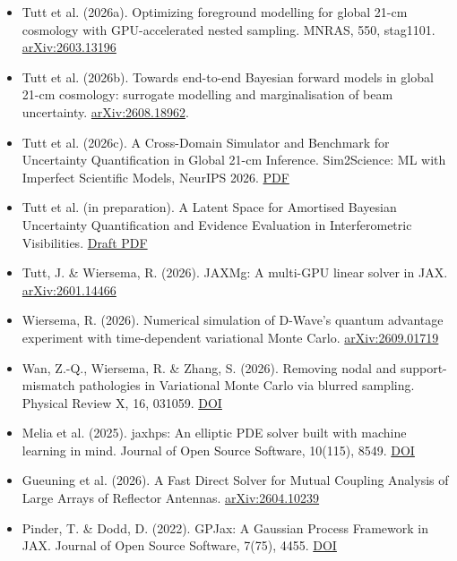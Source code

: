 \documentclass[12pt,a4paper]{awesome-cv}
\begin{document}
\begin{cvletter}
\begin{samepage}
\color{black}
\begingroup
\fontsize{9pt}{11pt}\selectfont
\begin{itemize}[topsep=0pt,itemsep=2pt,parsep=0pt]
\item Tutt et al. (2026a). Optimizing foreground modelling for global 21-cm cosmology with GPU-accelerated nested sampling. MNRAS, 550, stag1101. \enskip\textbullet\enskip \href{https://arxiv.org/abs/2603.13196}{\color{awesome}arXiv:2603.13196}
\item Tutt et al. (2026b). Towards end-to-end Bayesian forward models in global 21-cm cosmology: surrogate modelling and marginalisation of beam uncertainty. \href{https://arxiv.org/abs/2608.18962}{\color{awesome}arXiv:2608.18962}.
\item Tutt et al. (2026c). A Cross-Domain Simulator and Benchmark for Uncertainty Quantification in Global 21-cm Inference. Sim2Science: ML with Imperfect Scientific Models, NeurIPS 2026. \enskip\textbullet\enskip \href{https://jacobtutt.github.io/assets/pdf/tutt_2026_sim2sci.pdf}{\color{awesome}PDF}
\item Tutt et al. (in preparation). A Latent Space for Amortised Bayesian Uncertainty Quantification and Evidence Evaluation in Interferometric Visibilities. \enskip\textbullet\enskip \href{https://jacobtutt.github.io/assets/pdf/tutt_2026_bayeseor.pdf}{\color{awesome}Draft PDF}
\item Tutt, J. \& Wiersema, R. (2026). JAXMg: A multi-GPU linear solver in JAX. \enskip\textbullet\enskip \href{https://arxiv.org/abs/2601.14466}{\color{awesome}arXiv:2601.14466}
\item Wiersema, R. (2026). Numerical simulation of D-Wave's quantum advantage experiment with time-dependent variational Monte Carlo. \enskip\textbullet\enskip \href{https://arxiv.org/abs/2609.01719}{\color{awesome}arXiv:2609.01719}
\item Wan, Z.-Q., Wiersema, R. \& Zhang, S. (2026). Removing nodal and support-mismatch pathologies in Variational Monte Carlo via blurred sampling. Physical Review X, 16, 031059. \enskip\textbullet\enskip \href{https://doi.org/10.1103/jrn5-gv19}{\color{awesome}DOI}
\item Melia et al. (2025). jaxhps: An elliptic PDE solver built with machine learning in mind. Journal of Open Source Software, 10(115), 8549. \enskip\textbullet\enskip \href{https://doi.org/10.21105/joss.08549}{\color{awesome}DOI}
\item Gueuning et al. (2026). A Fast Direct Solver for Mutual Coupling Analysis of Large Arrays of Reflector Antennas. \enskip\textbullet\enskip \href{https://arxiv.org/abs/2604.10239}{\color{awesome}arXiv:2604.10239}
\item Pinder, T. \& Dodd, D. (2022). GPJax: A Gaussian Process Framework in JAX. Journal of Open Source Software, 7(75), 4455. \enskip\textbullet\enskip \href{https://doi.org/10.21105/joss.04455}{\color{awesome}DOI}
\end{itemize}
\endgroup
\end{samepage}

\end{cvletter}
\end{document}
